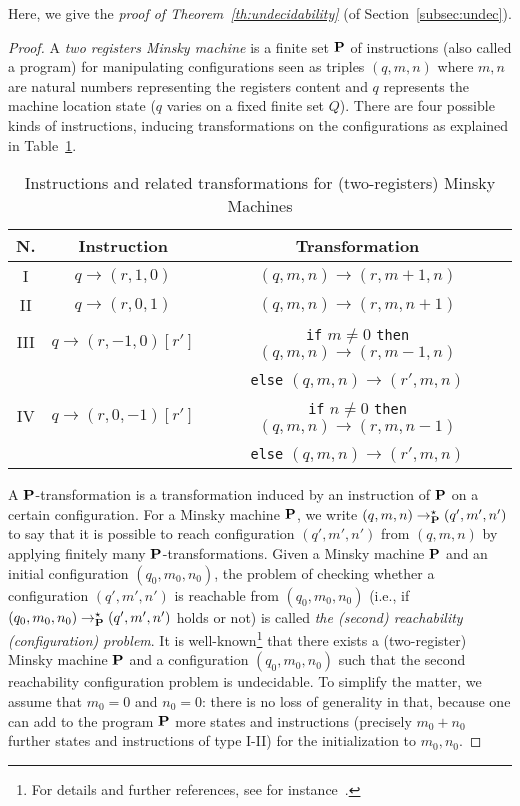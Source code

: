 \documentclass{LMCS}
\theoremstyle{plain}\newtheorem{assumption}[thm]{Assumption}
\theoremstyle{plain}\newtheorem{proposition}[thm]{Proposition}
\theoremstyle{plain}\newtheorem{property}[thm]{Property}
\theoremstyle{plain}\newtheorem{example}[thm]{Example}
\theoremstyle{plain}\newtheorem{claim}[thm]{Claim}
\theoremstyle{plain}\newtheorem{lemma}[thm]{Lemma}
\begin{document}
Here, we give the \emph{proof of Theorem~\ref{th:undecidability}} (of
Section~\ref{subsec:undec}).
\begin{proof}
 A \emph{two registers Minsky machine} is a finite set $\bf P$ of
  instructions (also called a program) for manipulating configurations
  seen as triples $(q,m,n)$ where $m,n$ are natural numbers
  representing the registers content and $q$ represents the machine
  location state ($q$ varies on a fixed finite set $Q$).  There are
  four possible kinds of instructions, inducing transformations on the
  configurations as explained in Table~\ref{tab:Minsky}.
\begin{table}[ht]
  \begin{center}
  \begin{tabular}{|c|c|c|}
    \hline
N.  & Instruction         & Transformation\\ \hline
    I   & $q\to(r,1,0)$       & $(q, m,n) \to (r, m+1, n)$ \\ \hline
    II  & $q\to(r,0,1)$       & $(q, m,n) \to (r, m, n+1)$ \\ \hline
    III & $q\to(r,-1,0)[r']$  & {\tt if} $m\neq 0$ {\tt then} $(q, m,n) \to (r, m-1, n)$ \\
        &                     & {\tt else} $(q, m,n) \to (r', m, n)$ \hspace{21.5mm} \\ \hline
    IV  & $q\to(r,0,-1)[r']$  & {\tt if} $n\neq 0$ {\tt then} $(q, m,n) \to (r, m, n-1)$ \\
        &                     & {\tt else} $(q, m,n) \to (r', m, n)$ \hspace{20.5mm} \\
        \hline
   \end{tabular}
   \end{center}
   \caption{\label{tab:Minsky} Instructions and related transformations for (two-registers) Minsky Machines}
\end{table}
A $\bf P$-transformation is a transformation induced by an instruction
of $\bf P$ on a certain configuration.  For a Minsky machine $\bf P$,
we write $(q, m, n) \rightarrow^{\star}_{\bf P} (q', m', n')$ to say
that it is possible to reach configuration $(q', m', n')$ from $(q, m,
n)$ by applying finitely many $\bf P$-transformations.  Given a Minsky
machine $\bf P$ and an initial configuration $(q_0, m_0, n_0)$, the
problem of checking whether a configuration $(q', m', n')$ is
reachable from $(q_0, m_0, n_0)$ (i.e., if $(q_0, m_0,
n_0)\rightarrow^{\star}_{\bf P} (q', m', n')$ holds or not) is called
\emph{the (second) reachability (configuration) problem}.  It is
well-known\footnote{For details and further references, see for
  instance~\cite{CZ}. 
} that there exists a (two-register)
Minsky machine $\bf P$ and a configuration $(q_0, m_0, n_0)$ such that
the second reachability configuration problem is undecidable. To
simplify the matter, we assume that $m_0=0$ and $n_0=0$: there is no
loss of generality in that, because one can add to the program $\bf P$
more states and instructions (precisely $m_0+n_0$ further states and
instructions of type I-II) for the initialization to $m_0, n_0$.


\end{proof}
\end{document}
